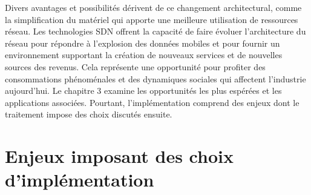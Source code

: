 


Divers avantages et possibilités dérivent de ce changement architectural, comme la simplification du matériel qui apporte une  meilleure utilisation de ressources réseau. Les technologies SDN offrent la capacité de faire évoluer l'architecture du réseau pour répondre à l'explosion des données mobiles et pour fournir un environnement supportant la création de nouveaux services et  de nouvelles sources des revenus. Cela représente une opportunité pour profiter des consommations phénoménales et des dynamiques sociales qui affectent l'industrie aujourd'hui. \cite{IntelCloudEPC}
Le chapitre 3 examine les opportunités les plus espérées et les applications associées.  
Pourtant, l'implémentation comprend des enjeux dont le traitement impose des choix discutés ensuite. 

\clearpage

\section{Enjeux imposant des choix d'implémentation}


